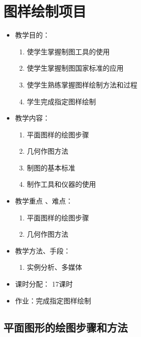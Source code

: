 \chapter{图样绘制项目}
\begin{itemize}
\item 教学目的：
\begin{enumerate}
\item 使学生掌握制图工具的使用
\item 使学生掌握制图国家标准的应用
\item 使学生熟练掌握图样绘制方法和过程
\item 学生完成指定图样绘制
\end{enumerate}
\item 教学内容：
\begin{enumerate}
\item 平面图样的绘图步骤
\item 几何作图方法
\item 制图的基本标准
\item 制作工具和仪器的使用
\end{enumerate}
\item 教学重点 、难点：
\begin{enumerate}
\item 平面图样的绘图步骤
\item 几何作图方法
\end{enumerate}
\item 教学方法、手段：
\begin{enumerate}
\item 实例分析、多媒体
\end{enumerate}
\item 课时分配：
17课时
\item 作业：完成指定图样绘制
\end{itemize}

\section{平面图形的绘图步骤和方法}

